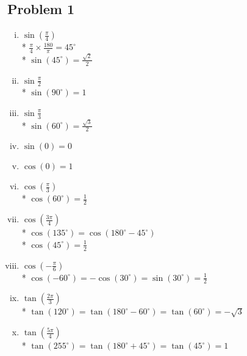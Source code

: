 \documentclass[a4paper]{article}
\begin{document}
  \subsection*{Problem 1}
  \begin{enumerate}[i.]
    \item $\sin (\frac{\pi}{4}) $\\*
    $\frac{\pi}{4} \times \frac{180}{\pi} = 45^{\circ}$\\*
    $\sin(45^{\circ}) = \frac{\sqrt{2}}{2}$
    
    \item $\sin \frac{\pi}{2} $\\*
    $\sin(90^{\circ}) = 1$
    
    \item $\sin \frac{\pi}{3}$\\*
    $\sin(60^{\circ}) = \frac{\sqrt{3}}{2}$
    
    \item $\sin(0) = 0$
    
    \item $\cos(0) = 1$
    
    \item $\cos(\frac{\pi}{3})$\\* 
    $\cos(60^{\circ}) = \frac{1}{2}$
    
    \item $\cos(\frac{3 \pi}{4})$\\*
    $\cos(135^{\circ}) = \cos(180^{\circ} - 45^{\circ})$\\*
    $\cos(45^{\circ}) = \frac{1}{2}$
    
    \item $\cos(-\frac{\pi}{6})$\\*
    $\cos(-60^{\circ}) = - \cos(30^{\circ}) = \sin(30^{\circ}) = \frac{1}{2}$

    \item $\tan(\frac{2 \pi}{3})$\\*
    $\tan(120^{\circ}) = \tan(180^{\circ} - 60^{\circ}) = \tan(60^{\circ}) = - \sqrt{3}$

    \item $\tan(\frac{5 \pi}{4})$\\*
    $\tan(255^{\circ}) = \tan(180^{\circ} + 45^{\circ}) = \tan(45^{\circ}) = 1 $
  \end{enumerate}
\end{document}
